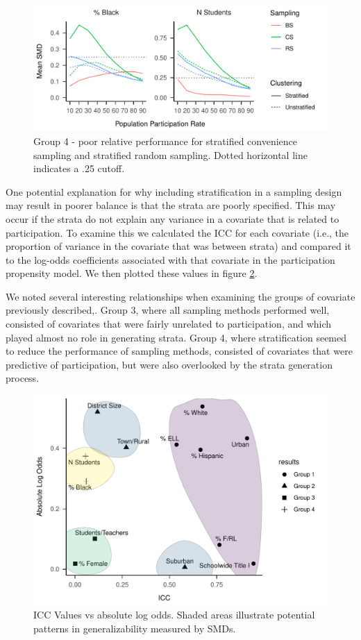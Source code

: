 \documentclass[
  english,
  man,floatsintext]{apa6}
\begin{document}
\begin{figure}
\centering
\includegraphics{GenSamp-Paper_files/figure-latex/fig-SMD-by-Var-bad-1.pdf}
\caption{\label{fig:fig-SMD-by-Var-bad}Group 4 - poor relative performance for stratified convenience sampling and stratified random sampling. Dotted horizontal line indicates a .25 cutoff.}
\end{figure}

One potential explanation for why including stratification in a sampling design may result in poorer balance is that the strata are poorly specified. This may occur if the strata do not explain any variance in a covariate that is related to participation. To examine this we calculated the ICC for each covariate (i.e., the proportion of variance in the covariate that was between strata) and compared it to the log-odds coefficients associated with that covariate in the participation propensity model. We then plotted these values in figure \ref{fig:fig-ICCvsCoef}.

We noted several interesting relationships when examining the groups of covariate previously described,. Group 3, where all sampling methods performed well, consisted of covariates that were fairly unrelated to participation, and which played almost no role in generating strata. Group 4, where stratification seemed to reduce the performance of sampling methods, consisted of covariates that were predictive of participation, but were also overlooked by the strata generation process.

\begin{figure}
\centering
\includegraphics{GenSamp-Paper_files/figure-latex/fig-ICCvsCoef-1.pdf}
\caption{\label{fig:fig-ICCvsCoef}ICC Values vs absolute log odds. Shaded areas illustrate potential patterns in generalizability measured by SMDs.}
\end{figure}
\end{document}
